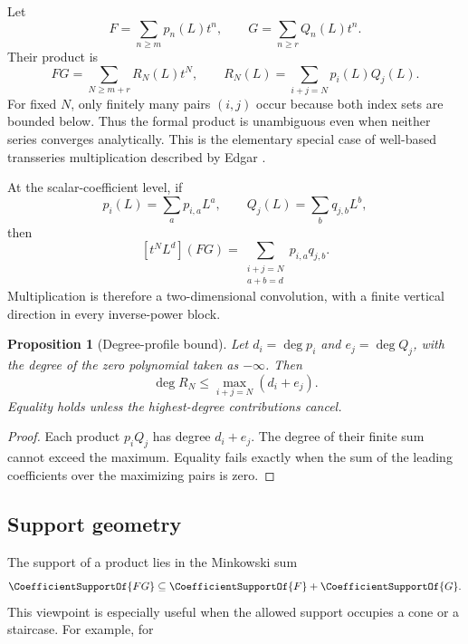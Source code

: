 \documentclass[11pt]{article}
\theoremstyle{pltheorem}
\newtheorem{proposition}[theorem]{Proposition}
\begin{document}
Let
\begin{equation}\label{eq:F-G-series}
 F=\sum_{n\ge m}p_n(L)t^n,
 \qquad
 G=\sum_{n\ge r}Q_n(L)t^n.
\end{equation}
Their product is
\begin{equation}\label{eq:Cauchy-product}
 FG=\sum_{N\ge m+r}R_N(L)t^N,
 \qquad
 R_N(L)=\sum_{i+j=N}p_i(L)Q_j(L).
\end{equation}
For fixed \(N\), only finitely many pairs \((i,j)\) occur because both index sets are bounded below.  Thus the formal product is unambiguous even when neither series converges analytically.  This is the elementary special case of well-based transseries multiplication described by Edgar \cite{edgar-beginners}.

At the scalar-coefficient level, if
\[
 p_i(L)=\sum_a p_{i,a}L^a,
 \qquad
 Q_j(L)=\sum_b q_{j,b}L^b,
\]
then
\begin{equation}\label{eq:2d-convolution}
 [t^NL^d](FG)
 =\sum_{\substack{i+j=N\\a+b=d}}p_{i,a}q_{j,b}.
\end{equation}
Multiplication is therefore a two-dimensional convolution, with a finite vertical direction in every inverse-power block.

\begin{proposition}[Degree-profile bound]\label{prop:degree-profile}
Let \(d_i=\deg p_i\) and \(e_j=\deg Q_j\), with the degree of the zero polynomial taken as \(-\infty\).  Then
\begin{equation}\label{eq:degree-bound}
 \deg R_N\le\max_{i+j=N}(d_i+e_j).
\end{equation}
Equality holds unless the highest-degree contributions cancel.
\end{proposition}

\begin{proof}
Each product \(p_iQ_j\) has degree \(d_i+e_j\).  The degree of their finite sum cannot exceed the maximum.  Equality fails exactly when the sum of the leading coefficients over the maximizing pairs is zero.
\end{proof}

\subsection{Support geometry}

The support of a product lies in the Minkowski sum
\begin{equation}\label{eq:support-Minkowski}
 \CoefficientSupportOf{FG}\subseteq
 \CoefficientSupportOf{F}+\CoefficientSupportOf{G}.
\end{equation}
This viewpoint is especially useful when the allowed support occupies a cone or a staircase.  For example, for
\end{document}
